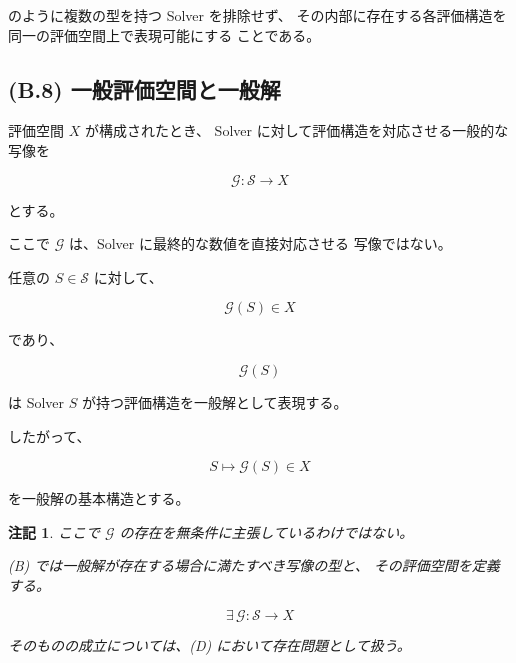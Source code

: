 \documentclass[a4paper,11pt]{article}
\newtheorem{remark}[definition]{注記}
\newcommand{\Solver}{\mathcal{S}}
\begin{document}
のように複数の型を持つ Solver を排除せず、
その内部に存在する各評価構造を同一の評価空間上で表現可能にする
ことである。


\subsection{(B.8) 一般評価空間と一般解}
\label{subsec:B8}

評価空間 $X$ が構成されたとき、
Solver に対して評価構造を対応させる一般的な写像を

\begin{equation}
    \boxed{
        \mathcal{G}:
        \Solver
        \longrightarrow
        X
    }
    \label{eq:B-general-solution}
\end{equation}

とする。

ここで $\mathcal{G}$ は、Solver に最終的な数値を直接対応させる
写像ではない。

任意の $S\in\Solver$ に対して、

\begin{equation}
    \mathcal{G}(S)\in X
\end{equation}

であり、

\begin{equation}
    \mathcal{G}(S)
\end{equation}

は Solver $S$ が持つ評価構造を一般解として表現する。

したがって、

\begin{equation}
    \boxed{
        S
        \longmapsto
        \mathcal{G}(S)
        \in X
    }
    \label{eq:B-general-solution-structure}
\end{equation}

を一般解の基本構造とする。

\begin{remark}
ここで $\mathcal{G}$ の存在を無条件に主張しているわけではない。

(B) では一般解が存在する場合に満たすべき写像の型と、
その評価空間を定義する。

\begin{equation}
    \exists\,
    \mathcal{G}:
    \Solver\to X
\end{equation}

そのものの成立については、(D) において存在問題として扱う。
\end{remark}
\end{document}
